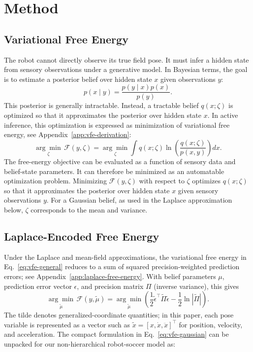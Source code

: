 \section{Method}
\label{sec:method}

\subsection{Variational Free Energy}
\label{subsec:first-principles}

The robot cannot directly observe its true field pose. It must infer a hidden state from sensory observations under a generative model. In Bayesian terms, the goal is to estimate a posterior belief over hidden state $x$ given observations $y$:
\begin{equation}
    p(x \mid y) =
    \frac{p(y \mid x)p(x)}{p(y)}.
    \label{eq:bayes}
\end{equation}
This posterior is generally intractable. Instead, a tractable belief $q(x;\zeta)$ is optimized so that it approximates the posterior over hidden state $x$. In active inference, this optimization is expressed as minimization of variational free energy, see Appendix~\ref{app:vfe-derivation}:
\begin{equation}
    \underset{\zeta}{\arg\min}\, \mathcal{F}(y,\zeta)
    =
    \underset{\zeta}{\arg\min}
    \int q(x;\zeta)
    \ln\left(
        \frac{q(x;\zeta)}{p(x,y)}
    \right) dx .
    \label{eq:vfe-general}
\end{equation}
The free-energy objective can be evaluated as a function of sensory data and belief-state parameters. It can therefore be minimized as an automatable optimization problem. Minimizing $\mathcal{F}(y,\zeta)$ with respect to $\zeta$ optimizes $q(x;\zeta)$ so that it approximates the posterior over hidden state $x$ given sensory observations $y$. For a Gaussian belief, as used in the Laplace approximation below, $\zeta$ corresponds to the mean and variance.
\subsection{Laplace-Encoded Free Energy}
\label{subsec:gaussian-errors}

Under the Laplace and mean-field approximations, the variational free energy in Eq.~\ref{eq:vfe-general} reduces to a sum of squared precision-weighted prediction errors; see Appendix~\ref{app:laplace-free-energy}. With belief parameters $\mu$, prediction error vector $\epsilon$, and precision matrix $\Pi$ (inverse variance), this gives
\begin{equation}
    \underset{\tilde{\mu}}{\arg\min}\, \mathcal{F}(y,\tilde{\mu})
    =
    \underset{\tilde{\mu}}{\arg\min}
    \left(
        \frac{1}{2}\tilde{\epsilon}^\top \tilde{\Pi} \tilde{\epsilon}
        -
        \frac{1}{2}\ln|\tilde{\Pi}|
    \right).
    \label{eq:vfe-gaussian}
\end{equation}
The tilde denotes generalized-coordinate quantities; in this paper, each pose variable is represented as a vector such as $\tilde{x}=[x,\dot{x},\ddot{x}]^\top$ for position, velocity, and acceleration. The compact formulation in Eq.~\ref{eq:vfe-gaussian} can be unpacked for our non-hierarchical robot-soccer model as:

